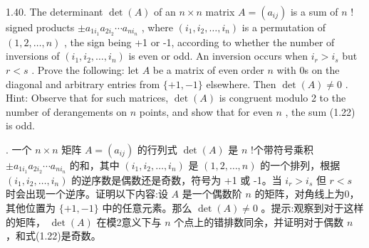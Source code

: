 \documentclass[10pt]{article}
\begin{document}
1.40. The determinant \(\det \left( A\right)\) of an \(n \times  n\) matrix \(A = \left( {a}_{ij}\right)\) is a sum of \(n\) ! signed products \(\pm  {a}_{1{i}_{1}}{a}_{2{i}_{2}}\cdots {a}_{n{i}_{n}}\) , where \(\left( {{i}_{1},{i}_{2},\ldots ,{i}_{n}}\right)\) is a permutation of \(\left( {1,2,\ldots ,n}\right)\) , the sign being +1 or -1, according to whether the number of inversions of \(\left( {{i}_{1},{i}_{2},\ldots ,{i}_{n}}\right)\) is even or odd. An inversion occurs when \({i}_{r} > {i}_{s}\) but \(r < s\) . Prove the following: let \(A\) be a matrix of even order \(n\) with 0s on the diagonal and arbitrary entries from \(\{  + 1, - 1\}\) elsewhere. Then \(\det \left( A\right)  \neq  0\) . Hint: Observe that for such matrices, \(\det \left( A\right)\) is congruent modulo 2 to the number of derangements on \(n\) points, and show that for even \(n\) , the sum (1.22) is odd.

\begin{tcolorbox}. 一个 \(n \times  n\) 矩阵 \(A = \left( {a}_{ij}\right)\) 的行列式 \(\det \left( A\right)\) 是 \(n\) !个带符号乘积 \(\pm  {a}_{1{i}_{1}}{a}_{2{i}_{2}}\cdots {a}_{n{i}_{n}}\) 的和，其中 \(\left( {{i}_{1},{i}_{2},\ldots ,{i}_{n}}\right)\) 是 \(\left( {1,2,\ldots ,n}\right)\) 的一个排列，根据 \(\left( {{i}_{1},{i}_{2},\ldots ,{i}_{n}}\right)\) 的逆序数是偶数还是奇数，符号为 +1 或 -1。当 \({i}_{r} > {i}_{s}\) 但 \(r < s\) 时会出现一个逆序。证明以下内容:设 \(A\) 是一个偶数阶 \(n\) 的矩阵，对角线上为0，其他位置为 \(\{  + 1, - 1\}\) 中的任意元素。那么 \(\det \left( A\right)  \neq  0\) 。提示:观察到对于这样的矩阵， \(\det \left( A\right)\) 在模2意义下与 \(n\) 个点上的错排数同余，并证明对于偶数 \(n\) ，和式(1.22)是奇数。
\end{tcolorbox}
\end{document}
